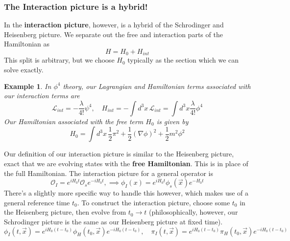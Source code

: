 \documentclass[11pt, oneside]{article}   	%
\theoremstyle{newline}
\theoremstyle{newline}
\theoremstyle{newline}
\theoremstyle{newline}
\newtheorem{example}{Example}
\theoremstyle{newline}
\begin{document}
\subsubsection{The Interaction picture is a hybrid!} 
In the \textbf{interaction picture}, however, is a hybrid of the Schrodinger and Heisenberg 
picture. We separate out the free and interaction parts of the Hamiltonian as 
\[
H = H_0 + H_{ int }
\] This split is arbitrary, but we choose $ H_0 $ typically as the section which we can solve exactly. 
\begin{example}
In $ \phi ^ 4 $ theory, our Lagrangian and Hamiltonian terms associated with our interaction terms are
\[
\mathcal{ L }_{ int   }  = - \frac{\lambda}{ 4 ! }\psi ^ 4 , \quad   H_{ int }  =- \int d^ 3 x \, \mathcal{ L }_{int} = \int d^ 3 x \frac{\lambda}{4 ! } \phi^ 4 
\] Our Hamiltonian associated with the free term $ H_0 $
is given by 
\[
H_0 = \int d^ 3 x \, \frac{1}{2 } \pi ^2 + \frac{1}{2 } ( \nabla \phi) ^ 2 + \frac{1}{2 } m^ 2 \phi^ 2 
\]  
\end{example}
Our definition of our interaction picture is similar to the Heisenberg picture, exact that we are evolving states with the \textbf{free Hamiltonian}. 
This is in place of the full Hamiltonian.  
The interaction picture for a general operator is 
\[
\mathcal{ O }_ I = e^{ i H_0 t } \mathcal{ O }_s  e^{ - i H_0 t }, \implies \phi_ I ( x)  = e^{ i H_0 t } \phi_s( \vec{x} ) e^{ - H_0 t } 
\]  There's a slightly more specific way to handle this however, 
which makes use of a general reference time $ t_0 $. 
To construct the interaction picture, choose some $ t_0 $ in 
the Heisenberg picture, then evolve from $ t_0 \to t $ (philosophically, 
however, our Schrodinger picture is the same as our Heisenberg picture at 
fixed time).
\[
\phi_I( t, \vec{x} ) = e^{ i H_0 (  t- t_0 ) }\phi_H ( t_0 , \vec{x} ) e^{  - i H_0  ( t - t_0 ) }, \quad \pi_I ( t, \vec{x} ) = e^{ i H_0 ( t - t_0 ) } \pi_H ( t_0 , \vec{x} ) e^{  - i H_0 ( t -t_0 ) }
\]
\end{document}
